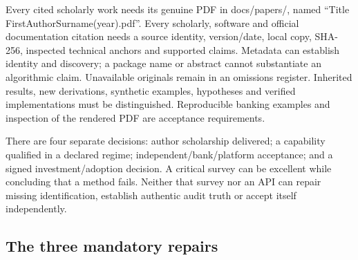 \documentclass[
  11pt,
  a4paper,
]{article}
\begin{document}
Every cited scholarly work needs its genuine PDF in docs/papers/, named
``Title FirstAuthorSurname(year).pdf''. Every scholarly, software and
official documentation citation needs a source identity, version/date,
local copy, SHA-256, inspected technical anchors and supported claims.
Metadata can establish identity and discovery; a package name or
abstract cannot substantiate an algorithmic claim. Unavailable originals
remain in an omissions register. Inherited results, new derivations,
synthetic examples, hypotheses and verified implementations must be
distinguished. Reproducible banking examples and inspection of the
rendered PDF are acceptance requirements.

There are four separate decisions: author scholarship delivered; a
capability qualified in a declared regime; independent/bank/platform
acceptance; and a signed investment/adoption decision. A critical survey
can be excellent while concluding that a method fails. Neither that
survey nor an API can repair missing identification, establish authentic
audit truth or accept itself independently.

\hypertarget{the-three-mandatory-repairs}{%
\subsection{The three mandatory
repairs}\label{the-three-mandatory-repairs}}
\end{document}
